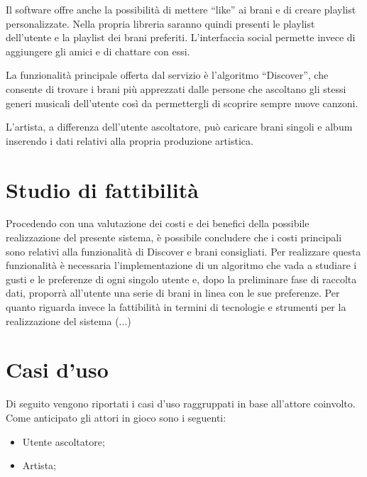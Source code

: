 Il software offre anche la possibilità di mettere ``like'' ai brani e di creare playlist
personalizzate. Nella propria libreria saranno quindi presenti le playlist dell'utente e
la playlist dei brani preferiti. L'interfaccia social permette invece di aggiungere gli
amici e di chattare con essi.

La funzionalità principale offerta dal servizio è l'algoritmo ``Discover'', che consente
di trovare i brani più apprezzati dalle persone che ascoltano gli stessi generi musicali
dell'utente così da permettergli di scoprire sempre nuove canzoni.

L'artista, a differenza dell'utente ascoltatore, può caricare brani singoli e album
inserendo i dati relativi alla propria produzione artistica.


\vspace{1cm}
\section{Studio di fattibilità}
Procedendo con una valutazione dei costi e dei benefici della possibile realizzazione del
presente sistema, è possibile concludere che i costi principali sono relativi alla
funzionalità di Discover e brani consigliati. Per realizzare questa funzionalità è
necessaria l'implementazione di un algoritmo che vada a studiare i gusti e le preferenze
di ogni singolo utente e, dopo la preliminare fase di raccolta dati, proporrà all'utente
una serie di brani in linea con le sue preferenze. Per quanto riguarda invece la
fattibilità in termini di tecnologie e strumenti per la realizzazione del sistema (...)


\newpage
\section{Casi d'uso}
Di seguito vengono riportati i casi d'uso raggruppati in base all'attore coinvolto. Come
anticipato gli attori in gioco sono i seguenti:
\begin{itemize}
      \item Utente ascoltatore;
      \item Artista;
\end{itemize}

